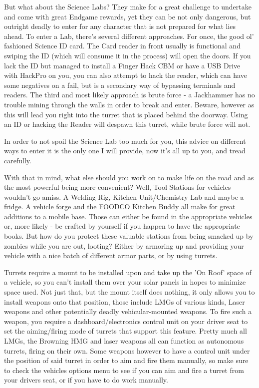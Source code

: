 \documentclass[11pt]{report}
\begin{document}
But what about the Science Labs?
They make for a great challenge to undertake and come with great Endgame rewards, yet they can be not only dangerous, but outright deadly to enter for any character that is not prepared for what lies ahead.
To enter a Lab, there's several different approaches. For once, the good ol' fashioned Science ID card. The Card reader in front usually is functional and swiping the ID (which will consume it in the process) will open the doors. If you lack the ID but managed to install a Finger Hack CBM or have a USB Drive with HackPro on you, you can also attempt to hack the reader, which can have some negatives on a fail, but is a secondary way of bypassing terminals and readers. The third and most likely approach is brute force - a Jackhammer has no trouble mining through the walls in order to break and enter. Beware, however as this will lead you right into the turret that is placed behind the doorway. Using an ID or hacking the Reader will despawn this turret, while brute force will not.

In order to not spoil the Science Lab too much for you, this advice on different ways to enter it is the only one I will provide, now it's all up to you, and tread carefully.

With that in mind, what else should you work on to make life on the road and as the most powerful being more convenient? Well, Tool Stations for vehicles wouldn't go amiss. A Welding Rig, Kitchen Unit/Chemistry Lab and maybe a fridge. A vehicle forge and the FOODCO Kitchen Buddy all make for great additions to a mobile base. Those can either be found in the appropriate vehicles or, more likely - be crafted by yourself if you happen to have the appropriate books. But how do you protect these valuable stations from being smacked up by zombies while you are out, looting? Either by armoring up and providing your vehicle with a nice batch of different armor parts, or by using turrets.

Turrets require a mount to be installed upon and take up the 'On Roof' space of a vehicle, so you can't install them over your solar panels in hopes to minimize space used. Not just that, but the mount itself does nothing, it only allows you to install weapons onto that position, those include LMGs of various kinds, Laser weapons and other potentially deadly vehicular-mounted weapons. To fire such a weapon, you require a dashboard/electronics control unit on your driver seat to set the aiming/firing mode of turrets that support this feature. Pretty much all LMGs, the Browning HMG and laser weapons all can function as autonomous turrets, firing on their own. Some weapons however to have a control unit under the position of said turret in order to aim and fire them manually, so make sure to check the vehicles options menu to see if you can aim and fire a turret from your drivers seat, or if you have to do work manually.
\end{document}
